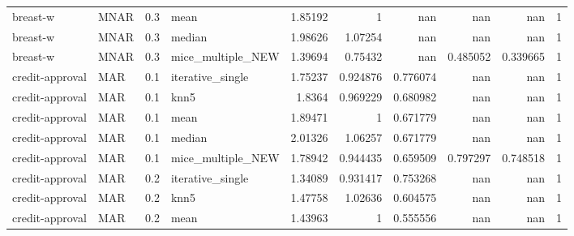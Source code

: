 \begin{table}[ht]
\begin{tabular}{llrlrrrrrr}
 breast-w        & MNAR        &         0.3 & mean              &       1.85192  &             1        &            nan         &                       nan        &                    nan         &         1 \\
 breast-w        & MNAR        &         0.3 & median            &       1.98626  &             1.07254  &            nan         &                       nan        &                    nan         &         1 \\
 breast-w        & MNAR        &         0.3 & mice\_multiple\_NEW &       1.39694  &             0.75432  &            nan         &                         0.485052 &                      0.339665  &         1 \\
 credit-approval & MAR         &         0.1 & iterative\_single  &       1.75237  &             0.924876 &              0.776074  &                       nan        &                    nan         &         1 \\
 credit-approval & MAR         &         0.1 & knn5              &       1.8364   &             0.969229 &              0.680982  &                       nan        &                    nan         &         1 \\
 credit-approval & MAR         &         0.1 & mean              &       1.89471  &             1        &              0.671779  &                       nan        &                    nan         &         1 \\
 credit-approval & MAR         &         0.1 & median            &       2.01326  &             1.06257  &              0.671779  &                       nan        &                    nan         &         1 \\
 credit-approval & MAR         &         0.1 & mice\_multiple\_NEW &       1.78942  &             0.944435 &              0.659509  &                         0.797297 &                      0.748518  &         1 \\
 credit-approval & MAR         &         0.2 & iterative\_single  &       1.34089  &             0.931417 &              0.753268  &                       nan        &                    nan         &         1 \\
 credit-approval & MAR         &         0.2 & knn5              &       1.47758  &             1.02636  &              0.604575  &                       nan        &                    nan         &         1 \\
 credit-approval & MAR         &         0.2 & mean              &       1.43963  &             1        &              0.555556  &                       nan        &                    nan         &         1 \\

\end{tabular}
\end{table}

